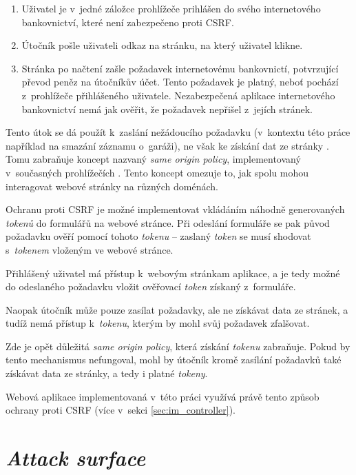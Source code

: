 \begin{enumerate}
    \item Uživatel je v~jedné záložce prohlížeče prihlášen do svého internetového bankovnictví, které není zabezpečeno proti CSRF.
    \item Útočník pošle uživateli odkaz na stránku, na který uživatel klikne.
    \item Stránka po načtení zašle požadavek internetovému bankovnictí, potvrzující převod peněz na útočníkův účet. Tento požadavek je platný, neboť pochází z~prohlížeče přihlášeného uživatele. Nezabezpečená aplikace internetového bankovnictví nemá jak ověřit, že požadavek nepřišel z~jejích stránek.
\end{enumerate}

Tento útok se dá použít k~zaslání nežádoucího požadavku (v~kontextu této práce například na smazání záznamu o~garáži), ne však ke získání dat ze stránky \cite{csrf_owasp}. Tomu zabraňuje koncept nazvaný \textit{same origin policy}, implementovaný v~současných prohlížečích \cite{sec_handbook}. Tento koncept omezuje to, jak spolu mohou interagovat webové stránky na různých doménách.

Ochranu proti CSRF je možné implementovat vkládáním náhodně generovaných \textit{tokenů} do formulářů na webové stránce. Při odeslání formuláře se pak původ požadavku ověří pomocí tohoto \textit{tokenu} -- zaslaný \textit{token} se musí shodovat s~\textit{tokenem} vloženým ve webové stránce.

Přihlášený uživatel má přístup k~webovým stránkam aplikace, a je tedy možné do odeslaného požadavku vložit ověřovací \textit{token} získaný z~formuláře. 

Naopak útočník může pouze zasílat požadavky, ale ne získávat data ze stránek, a tudíž nemá přístup k~\textit{tokenu}, kterým by mohl svůj požadavek zfalšovat.

Zde je opět důležitá \textit{same origin policy}, která získání \textit{tokenu} zabraňuje. Pokud by tento mechanismus nefungoval, mohl by útočník kromě zasílání požadavků také získávat data ze stránky, a tedy i platné \textit{tokeny}.

Webová aplikace implementovaná v~této práci využívá právě tento způsob ochrany proti CSRF (více v~sekci \ref{sec:im_controller}).

\section{\textit{Attack surface}}

